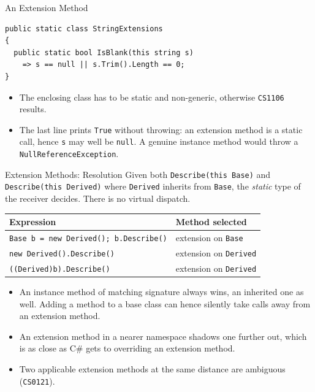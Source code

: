 \begin{solutionframe}{An Extension Method}
  \begin{lstlisting}[basicstyle=\scriptsize\ttfamily]
public static class StringExtensions
{
  public static bool IsBlank(this string s)
    => s == null || s.Trim().Length == 0;
}
  \end{lstlisting}
  \begin{itemize}
    \item The enclosing class has to be static and non-generic, otherwise
      \texttt{CS1106} results.
    \item The last line prints \texttt{True} without throwing: an extension
      method is a static call, hence \texttt{s} may well be \texttt{null}. A
      genuine instance method would throw a \texttt{NullReferenceException}.
  \end{itemize}
  \vspace{1ex}

\end{solutionframe}

\begin{frame}{Extension Methods: Resolution}
  Given both \texttt{Describe(this Base)} and \texttt{Describe(this Derived)}
  where \texttt{Derived} inherits from \texttt{Base},
  the \emph{static} type of the receiver decides. There is no virtual dispatch.
  \vspace{1ex}

  \begin{center}
    \footnotesize
    \begin{tabular}{ll}
      \hline
      \textbf{Expression} & \textbf{Method selected}\\
      \hline
      \texttt{Base b = new Derived(); b.Describe()} & extension on \texttt{Base}\\
      \texttt{new Derived().Describe()}             & extension on \texttt{Derived}\\
      \texttt{((Derived)b).Describe()}              & extension on \texttt{Derived}\\
      \hline
    \end{tabular}
  \end{center}
  \vspace{1ex}

  \begin{itemize}
    \item An instance method of matching signature always wins, an inherited one
      as well. Adding a method to a base class can hence silently take calls
      away from an extension method.
    \item An extension method in a nearer namespace shadows one further out,
      which is as close as C\# gets to overriding an extension method.
    \item Two applicable extension methods at the same distance are ambiguous
      (\texttt{CS0121}).
  \end{itemize}
\end{frame}

